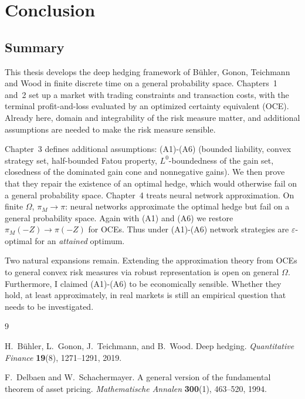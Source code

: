 \documentclass[11pt,a4paper]{report}
\numberwithin{equation}{chapter}
\begin{document}
\setcounter{chapter}{4}

\chapter{Conclusion}

\section{Summary}

This thesis develops the deep hedging framework of B\"uhler, Gonon, Teichmann and Wood \cite{buehler} in finite discrete time on a general probability space. Chapters~1 and~2 set up a market with trading constraints and transaction costs, with the terminal profit-and-loss evaluated by an optimized certainty equivalent (OCE). Already here, domain and integrability of the risk measure matter, and additional assumptions are needed to make the risk measure sensible.

Chapter~3 defines additional assumptions: (A1)-(A6) (bounded liability, convex strategy set, half-bounded Fatou property, $L^0$-boundedness of the gain set, closedness of the dominated gain cone and nonnegative gains). We then prove that they repair the existence of an optimal hedge, which would otherwise fail on a general probability space. Chapter~4 treats neural network approximation. On finite $\Omega$, $\pi_M\to\pi$: neural networks approximate the optimal hedge but fail on a general probability space. Again with (A1) and (A6) we restore $\pi_M(-Z)\to\pi(-Z)$ for OCEs. Thus under (A1)-(A6) network strategies are $\varepsilon$-optimal for an \emph{attained} optimum.

Two natural expansions remain. Extending the approximation theory from OCEs to general convex risk measures via robust representation \cite[Section~4.5]{buehler} is open on general $\Omega$. Furthermore, I claimed (A1)-(A6) to be economically sensible. Whether they hold, at least approximately, in real markets is still an empirical question that needs to be investigated.

\begin{thebibliography}{9}

    H.~B\"uhler, L.~Gonon, J.~Teichmann, and B.~Wood.
    Deep hedging.
    \emph{Quantitative Finance} \textbf{19}(8), 1271--1291, 2019.

    F.~Delbaen and W.~Schachermayer.
    A general version of the fundamental theorem of asset pricing.
    \emph{Mathematische Annalen} \textbf{300}(1), 463--520, 1994.

\end{thebibliography}
\end{document}
